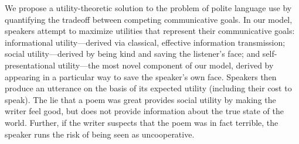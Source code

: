 \documentclass[oneside]{report}
\begin{document}
We propose a utility-theoretic solution to the problem of polite
language use by quantifying the tradeoff between competing communicative
goals. In our model, speakers attempt to maximize utilities that
represent their communicative goals: informational utility---derived via
classical, effective information transmission; social utility---derived
by being kind and saving the listener's face; and self-presentational
utility---the most novel component of our model, derived by appearing in
a particular way to save the speaker's own face. Speakers then produce
an utterance on the basis of its expected utility (including their cost
to speak). The lie that a poem was great provides social utility by
making the writer feel good, but does not provide information about the
true state of the world. Further, if the writer suspects that the poem
was in fact terrible, the speaker runs the risk of being seen as
uncooperative.
\end{document}
